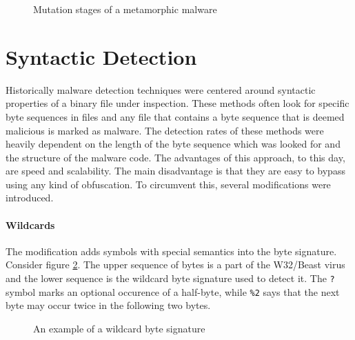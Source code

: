 \begin{figure}[H]
    \centering
    \caption{Mutation stages of a metamorphic malware}
    \label{fig_metamorph}
\end{figure}

\section{Syntactic Detection}
Historically malware detection techniques were centered around syntactic properties of a binary file under inspection. These methods often look for specific byte sequences in files and any file that contains a byte sequence that is deemed malicious is marked as malware. The detection rates of these methods were heavily dependent on the length of the byte sequence which was looked for and the structure of the malware code. The advantages of this approach, to this day, are speed and scalability. The main disadvantage is that they are easy to bypass using any kind of obfuscation. To circumvent this, several modifications were introduced.

\paragraph*{Wildcards} The modification adds symbols with special semantics into the byte signature. Consider figure \ref{fig_wildcards}. The upper sequence of bytes is a part of the W32/Beast virus and the lower sequence is the wildcard byte signature used to detect it. The \texttt{?} symbol marks an optional occurence of a half-byte, while \texttt{\%2} says that the next byte may occur twice in the following two bytes.

\begin{figure}[H]
    \centering
    \caption{An example of a wildcard byte signature}
    \label{fig_wildcards}
\end{figure}

